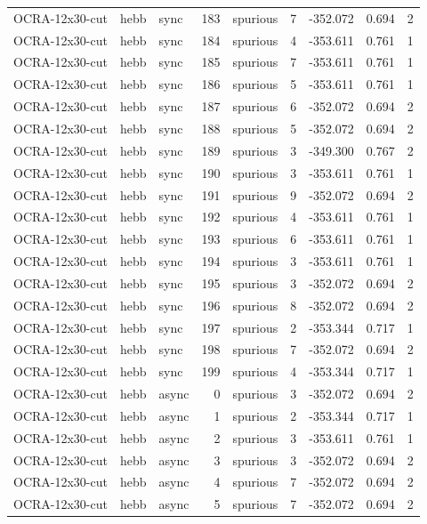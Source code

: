 \begin{tabular}{lllrlrrrr}
OCRA-12x30-cut & hebb & sync & 183 & spurious & 7 & -352.072 & 0.694 & 2 \\
OCRA-12x30-cut & hebb & sync & 184 & spurious & 4 & -353.611 & 0.761 & 1 \\
OCRA-12x30-cut & hebb & sync & 185 & spurious & 7 & -353.611 & 0.761 & 1 \\
OCRA-12x30-cut & hebb & sync & 186 & spurious & 5 & -353.611 & 0.761 & 1 \\
OCRA-12x30-cut & hebb & sync & 187 & spurious & 6 & -352.072 & 0.694 & 2 \\
OCRA-12x30-cut & hebb & sync & 188 & spurious & 5 & -352.072 & 0.694 & 2 \\
OCRA-12x30-cut & hebb & sync & 189 & spurious & 3 & -349.300 & 0.767 & 2 \\
OCRA-12x30-cut & hebb & sync & 190 & spurious & 3 & -353.611 & 0.761 & 1 \\
OCRA-12x30-cut & hebb & sync & 191 & spurious & 9 & -352.072 & 0.694 & 2 \\
OCRA-12x30-cut & hebb & sync & 192 & spurious & 4 & -353.611 & 0.761 & 1 \\
OCRA-12x30-cut & hebb & sync & 193 & spurious & 6 & -353.611 & 0.761 & 1 \\
OCRA-12x30-cut & hebb & sync & 194 & spurious & 3 & -353.611 & 0.761 & 1 \\
OCRA-12x30-cut & hebb & sync & 195 & spurious & 3 & -352.072 & 0.694 & 2 \\
OCRA-12x30-cut & hebb & sync & 196 & spurious & 8 & -352.072 & 0.694 & 2 \\
OCRA-12x30-cut & hebb & sync & 197 & spurious & 2 & -353.344 & 0.717 & 1 \\
OCRA-12x30-cut & hebb & sync & 198 & spurious & 7 & -352.072 & 0.694 & 2 \\
OCRA-12x30-cut & hebb & sync & 199 & spurious & 4 & -353.344 & 0.717 & 1 \\
OCRA-12x30-cut & hebb & async & 0 & spurious & 3 & -352.072 & 0.694 & 2 \\
OCRA-12x30-cut & hebb & async & 1 & spurious & 2 & -353.344 & 0.717 & 1 \\
OCRA-12x30-cut & hebb & async & 2 & spurious & 3 & -353.611 & 0.761 & 1 \\
OCRA-12x30-cut & hebb & async & 3 & spurious & 3 & -352.072 & 0.694 & 2 \\
OCRA-12x30-cut & hebb & async & 4 & spurious & 7 & -352.072 & 0.694 & 2 \\
OCRA-12x30-cut & hebb & async & 5 & spurious & 7 & -352.072 & 0.694 & 2 \\

\end{tabular}

